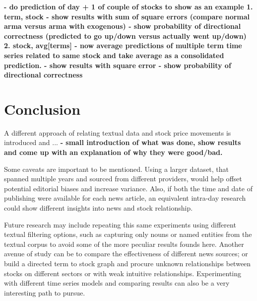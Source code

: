 \documentclass{article}
\begin{document}
\textbf{
- do prediction of day + 1 of couple of stocks to show as an example
1. term, stock
- show results with sum of square errors (compare normal arma versus arma with exogenous)
- show probability of directional correctness (predicted to go up/down versus actually went up/down)
2. stock, avg[terms]
- now average predictions of multiple term time series related to same stock and take average as a consolidated prediction.
- show results with square error
- show probability of directional correctness}


\section{Conclusion}
A different approach of relating textual data and stock price movements is introduced and ...
\textbf{- small introduction of what was done, show results and come up with an explanation of why they were good/bad.}

\par
Some caveats are important to be mentioned. Using a larger dataset, that spanned multiple years and sourced from different providers, would help offset potential editorial biases and increase variance. Also, if both the time and date of publishing were available for each news article, an equivalent intra-day research could show different insights into news and stock relationship.

\par
Future research may include repeating this same experiments using different textual filtering options, such as capturing only nouns or named entities from the textual corpus to avoid some of the more peculiar results founds here. Another avenue of study can be to compare the effectiveness of different news sources; or build a directed term to stock graph and procure unknown relationships between stocks on different sectors or with weak intuitive relationships. Experimenting with different time series models and comparing results can also be a very interesting path to pursue.


\end{document}
